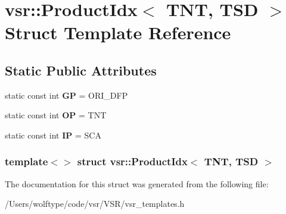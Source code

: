 \hypertarget{structvsr_1_1_product_idx_3_01_t_n_t_00_01_t_s_d_01_4}{\section{vsr\-:\-:Product\-Idx$<$ T\-N\-T, T\-S\-D $>$ Struct Template Reference}
\label{structvsr_1_1_product_idx_3_01_t_n_t_00_01_t_s_d_01_4}
}
\subsection*{Static Public Attributes}
\begin{DoxyCompactItemize}
\item 
\hypertarget{structvsr_1_1_product_idx_3_01_t_n_t_00_01_t_s_d_01_4_a22a9ab5ae7f7b03b225523463c7fb219}{static const int {\bfseries G\-P} = O\-R\-I\-\_\-\-D\-F\-P}\label{structvsr_1_1_product_idx_3_01_t_n_t_00_01_t_s_d_01_4_a22a9ab5ae7f7b03b225523463c7fb219}

\item 
\hypertarget{structvsr_1_1_product_idx_3_01_t_n_t_00_01_t_s_d_01_4_ae28fad0b2a972450d07cb643dc8f4caa}{static const int {\bfseries O\-P} = T\-N\-T}\label{structvsr_1_1_product_idx_3_01_t_n_t_00_01_t_s_d_01_4_ae28fad0b2a972450d07cb643dc8f4caa}

\item 
\hypertarget{structvsr_1_1_product_idx_3_01_t_n_t_00_01_t_s_d_01_4_a7eddcf0df95430e0ebdb3941a648c898}{static const int {\bfseries I\-P} = S\-C\-A}\label{structvsr_1_1_product_idx_3_01_t_n_t_00_01_t_s_d_01_4_a7eddcf0df95430e0ebdb3941a648c898}

\end{DoxyCompactItemize}
\subsubsection*{template$<$$>$ struct vsr\-::\-Product\-Idx$<$ T\-N\-T, T\-S\-D $>$}



The documentation for this struct was generated from the following file\-:\begin{DoxyCompactItemize}
\item 
/\-Users/wolftype/code/vsr/\-V\-S\-R/vsr\-\_\-templates.\-h\end{DoxyCompactItemize}
